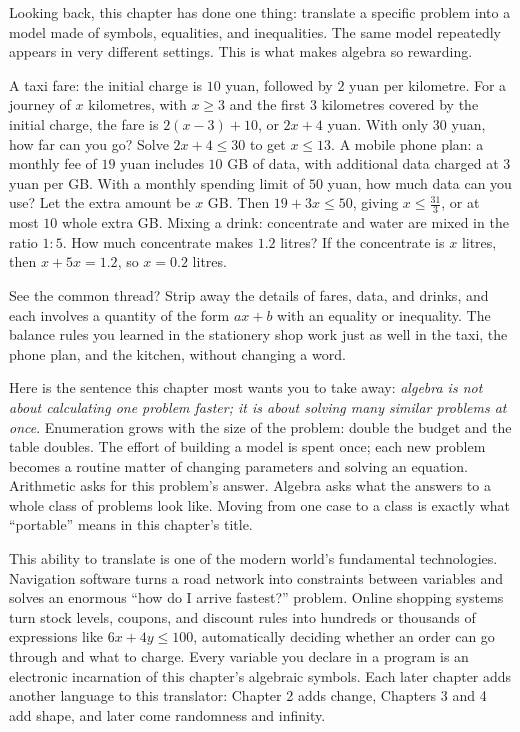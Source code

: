 Looking back, this chapter has done one thing: translate a specific problem into a model made of symbols, equalities, and inequalities. The same model repeatedly appears in very different settings. This is what makes algebra so rewarding.

A taxi fare: the initial charge is $10$ yuan, followed by $2$ yuan per kilometre. For a journey of $x$ kilometres, with $x\geq3$ and the first $3$ kilometres covered by the initial charge, the fare is $2(x-3)+10$, or $2x+4$ yuan. With only $30$ yuan, how far can you go? Solve $2x+4\leq30$ to get $x\leq13$. A mobile phone plan: a monthly fee of $19$ yuan includes $10$ GB of data, with additional data charged at $3$ yuan per GB. With a monthly spending limit of $50$ yuan, how much data can you use? Let the extra amount be $x$ GB. Then $19+3x\leq50$, giving $x\leq\frac{31}{3}$, or at most $10$ whole extra GB. Mixing a drink: concentrate and water are mixed in the ratio $1:5$. How much concentrate makes $1.2$ litres? If the concentrate is $x$ litres, then $x+5x=1.2$, so $x=0.2$ litres.

See the common thread? Strip away the details of fares, data, and drinks, and each involves a quantity of the form $ax+b$ with an equality or inequality. The balance rules you learned in the stationery shop work just as well in the taxi, the phone plan, and the kitchen, without changing a word.

Here is the sentence this chapter most wants you to take away: \emph{algebra is not about calculating one problem faster; it is about solving many similar problems at once}. Enumeration grows with the size of the problem: double the budget and the table doubles. The effort of building a model is spent once; each new problem becomes a routine matter of changing parameters and solving an equation. Arithmetic asks for this problem's answer. Algebra asks what the answers to a whole class of problems look like. Moving from one case to a class is exactly what ``portable'' means in this chapter's title.

\begin{lianjie}
This ability to translate is one of the modern world's fundamental technologies. Navigation software turns a road network into constraints between variables and solves an enormous ``how do I arrive fastest?'' problem. Online shopping systems turn stock levels, coupons, and discount rules into hundreds or thousands of expressions like $6x+4y\leq100$, automatically deciding whether an order can go through and what to charge. Every variable you declare in a program is an electronic incarnation of this chapter's algebraic symbols. Each later chapter adds another language to this translator: Chapter 2 adds change, Chapters 3 and 4 add shape, and later come randomness and infinity.
\end{lianjie}

